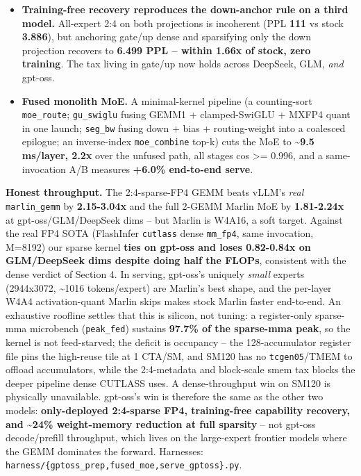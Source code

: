 \documentclass[
]{article}
\providecommand{\tightlist}{%
  \setlength{\itemsep}{0pt}\setlength{\parskip}{0pt}}
\begin{document}
\begin{itemize}
\tightlist
\item
  \textbf{Training-free recovery reproduces the down-anchor rule on a
  third model.} All-expert 2:4 on both projections is incoherent (PPL
  \textbf{111} vs stock \textbf{3.886}), but anchoring gate/up dense and
  sparsifying only the down projection recovers to \textbf{6.499 PPL --
  within 1.66x of stock, zero training}. The tax living in gate/up now
  holds across DeepSeek, GLM, \emph{and} gpt-oss.
\item
  \textbf{Fused monolith MoE.} A minimal-kernel pipeline (a
  counting-sort \texttt{moe\_route}; \texttt{gu\_swiglu} fusing GEMM1 +
  clamped-SwiGLU + MXFP4 quant in one launch; \texttt{seg\_bw} fusing
  down + bias + routing-weight into a coalesced epilogue; an
  inverse-index \texttt{moe\_combine} top-k) cuts the MoE to
  \textbf{\textasciitilde9.5 ms/layer, 2.2x} over the unfused path, all
  stages cos \textgreater= 0.996, and a same-invocation A/B measures
  \textbf{+6.0\% end-to-end serve}.
\end{itemize}

\textbf{Honest throughput.} The 2:4-sparse-FP4 GEMM beats vLLM's
\emph{real} \texttt{marlin\_gemm} by \textbf{2.15-3.04x} and the full
2-GEMM Marlin MoE by \textbf{1.81-2.24x} at gpt-oss/GLM/DeepSeek dims --
but Marlin is W4A16, a soft target. Against the real FP4 SOTA
(FlashInfer \texttt{cutlass} dense \texttt{mm\_fp4}, same invocation,
M=8192) our sparse kernel \textbf{ties on gpt-oss and loses 0.82-0.84x
on GLM/DeepSeek dims despite doing half the FLOPs}, consistent with the
dense verdict of Section 4. In serving, gpt-oss's uniquely \emph{small}
experts (2944x3072, \textasciitilde1016 tokens/expert) are Marlin's best
shape, and the per-layer W4A4 activation-quant Marlin skips makes stock
Marlin faster end-to-end. An exhaustive roofline settles that this is
silicon, not tuning: a register-only sparse-mma microbench
(\texttt{peak\_fed}) sustains \textbf{97.7\% of the sparse-mma peak}, so
the kernel is not feed-starved; the deficit is occupancy -- the
128-accumulator register file pins the high-reuse tile at 1 CTA/SM, and
SM120 has no \texttt{tcgen05}/TMEM to offload accumulators, while the
2:4-metadata and block-scale smem tax blocks the deeper pipeline dense
CUTLASS uses. A dense-throughput win on SM120 is physically unavailable.
gpt-oss's win is therefore the same as the other two models:
\textbf{only-deployed 2:4-sparse FP4, training-free capability recovery,
and \textasciitilde24\% weight-memory reduction at full sparsity} -- not
gpt-oss decode/prefill throughput, which lives on the large-expert
frontier models where the GEMM dominates the forward. Harnesses:
\texttt{harness/\{gptoss\_prep,fused\_moe,serve\_gptoss\}.py}.
\end{document}

